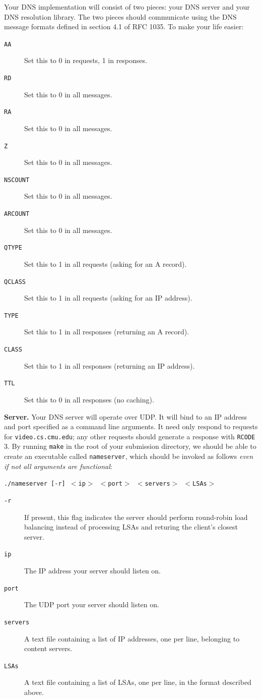 \documentclass{article}
\newcommand{\theurl}{\texttt{video.cs.cmu.edu}}
\begin{document}
Your DNS implementation will consist of two pieces: your DNS server and your
DNS resolution library. The two pieces should communicate using the DNS message
formats defined in section 4.1 of RFC 1035. To make your life easier:

\begin{description}
	\item[\texttt{AA}] Set this to 0 in requests, 1 in responses.
	\item[\texttt{RD}] Set this to 0 in all messages.
	\item[\texttt{RA}] Set this to 0 in all messages.
	\item[\texttt{Z}] Set this to 0 in all messages.
	\item[\texttt{NSCOUNT}] Set this to 0 in all messages.
	\item[\texttt{ARCOUNT}] Set this to 0 in all messages.
	\item[\texttt{QTYPE}] Set this to 1 in all requests (asking for an A record).
	\item[\texttt{QCLASS}] Set this to 1 in all requests (asking for an IP address).
	\item[\texttt{TYPE}] Set this to 1 in all responses (returning an A record).
	\item[\texttt{CLASS}] Set this to 1 in all responses (returning an IP address).
	\item[\texttt{TTL}] Set this to 0 in all responses (no caching).
\end{description}

\bigskip \noindent \textbf{Server.} Your DNS server will operate over UDP. It
will bind to an IP address and port specified as a command line arguments. It
need only respond to requests for \theurl; any other requests should generate a
response with \texttt{RCODE} 3. By running \texttt{make} in the root of your
submission directory, we should be able to create an executable called
\texttt{nameserver}, which should be invoked as follows \emph{even if not all
arguments are functional}:
\begin{center}
	\texttt{./nameserver [-r] $<$ip$>$ $<$port$>$ $<$servers$>$ $<$LSAs$>$}
\end{center}

\begin{description}
	\item[\texttt{-r}] If present, this flag indicates the server should
	perform round-robin load balancing instead of processing LSAs and returing
	the client's closest server.
	\item[\texttt{ip}] The IP address your server should listen on.
	\item[\texttt{port}] The UDP port your server should listen on.
	\item[\texttt{servers}] A text file containing a list of IP addresses, one
	per line, belonging to content servers.
	\item[\texttt{LSAs}] A text file containing a list of LSAs, one per line,
	in the format described above.
\end{description}
\end{document}
